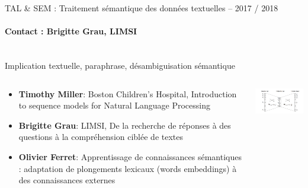 \begin{frame}{ TAL \& SEM : Traitement sémantique des données textuelles – 2017 / 2018}
\framesubtitle{Contact : Brigitte Grau, LIMSI}
\vspace{-1cm}
{\color{blue} }
\\
Implication textuelle, paraphrase, désambiguisation sémantique

\begin{columns}
\begin{column}{8cm}
\begin{itemize}
\item \textbf{Timothy Miller}: Boston Children's Hospital, Introduction to sequence models for Natural Language Processing
\item \textbf{Brigitte Grau}: LIMSI, De la recherche de réponses à des questions à la compréhension ciblée de textes
\item \textbf{Olivier Ferret}: Apprentissage de connaissances sémantiques : adaptation de plongements lexicaux (words embeddings) à des connaissances externes
\end{itemize}
\end{column}
\begin{column}{5cm}
\includegraphics[width=5cm]{Images/language.png}
\end{column}
\end{columns}
\end{frame}

